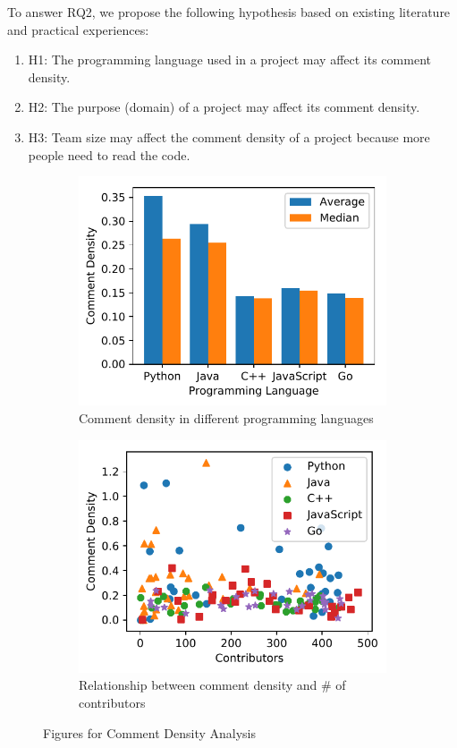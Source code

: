 \documentclass[sigconf,screen]{acmart}
\begin{document}
To answer RQ2, we propose the following hypothesis based on existing literature and practical experiences:
\begin{enumerate}
    \item H1: The programming language used in a project may affect its comment density.
    \item H2: The purpose (domain) of a project may affect its comment density.
    \item H3: Team size may affect the comment density of a project because more people need to read the code.
\end{enumerate}

\begin{figure}
    \begin{subfigure}[b]{0.2\textwidth}
        \centering
        \includegraphics[width=\textwidth]{figs/cd_by_lang.pdf}
        \caption{Comment density in different programming languages}
        \label{fig:cd_lang}
    \end{subfigure}
    \begin{subfigure}[b]{0.2\textwidth}
        \centering
        \includegraphics[width=\textwidth]{figs/cd_contrb.pdf}
        \caption{Relationship between comment density and \# of contributors}
        \label{fig:cd_contrib}
    \end{subfigure}
    \caption{Figures for Comment Density Analysis}
\end{figure}
\end{document}
